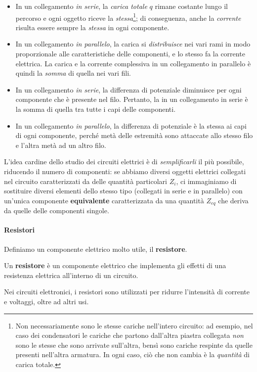 \begin{itemize}
	\item In un collegamento \textit{in serie}, la \textit{carica totale} $q$ rimane costante lungo il percorso e ogni oggetto riceve la \textit{stessa}\footnote{Non necessariamente sono le stesse cariche nell'intero circuito: ad esempio, nel caso dei condensatori le cariche che partono dall'altra piastra collegata \textit{non} sono le stesse che sono arrivate sull'altra, bensì sono cariche respinte da quelle presenti nell'altra armatura. In ogni caso, ciò che non cambia è la \textit{quantità} di carica totale.}; di conseguenza, anche la \textit{corrente} risulta essere sempre la \textit{stessa} in ogni componente.
	\item In un collegamento \textit{in parallelo}, la carica si \textit{distribuisce} nei vari rami in modo proporzionale alle caratteristiche delle componenti, e lo stesso fa la corrente elettrica. La carica e la corrente complessiva in un collegamento in parallelo è quindi la \textit{somma} di quella nei vari fili.
	\item In un collegamento \textit{in serie}, la differenza di potenziale diminuisce per ogni componente che è presente nel filo. Pertanto, la \ddp in un collegamento in serie è la somma di quella tra tutte i capi delle componenti.
	\item In un collegamento \textit{in parallelo}, la differenza di potenziale è la stessa ai capi di ogni componente, perché metà delle estremità sono attaccate allo stesso filo e l'altra metà ad un altro filo.
\end{itemize}
L'idea cardine dello studio dei circuiti elettrici è di \textit{semplificarli} il più possibile, riducendo il numero di componenti: se abbiamo diversi oggetti elettrici collegati nel circuito caratterizzati da delle quantità particolari $Z_i$, ci immaginiamo di sostituire diversi elementi dello stesso tipo (collegati in serie e in parallelo) con un'unica componente \textbf{equivalente} caratterizzata da una quantità $Z_{eq}$ che deriva da quelle delle componenti singole.
\paragraph{Resistori}
Definiamo un componente elettrico molto utile, il \textbf{resistore}.
\begin{define}[Resistore]
	Un \textbf{resistore} è un componente elettrico che implementa gli effetti di una resistenza elettrica all'interno di un circuito. 
\end{define}
\pagebreak
Nei circuiti elettronici, i resistori sono utilizzati per ridurre l'intensità di corrente e voltaggi, oltre ad altri usi.
